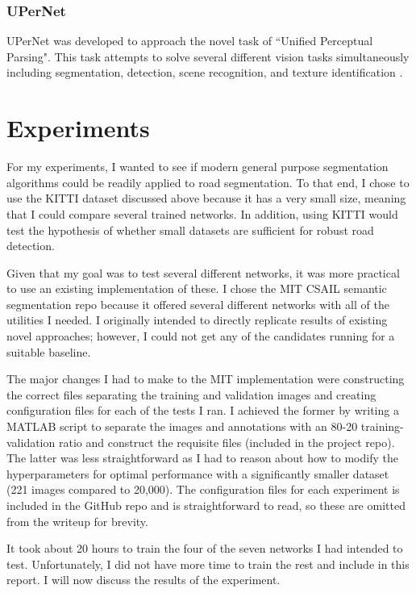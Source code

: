 \documentclass[10pt,twocolumn,letterpaper]{article}
\begin{document}
\subsubsection{UPerNet}
UPerNet was developed to approach the novel task of ``Unified Perceptual Parsing". This task attempts to solve several different vision tasks simultaneously including segmentation, detection, scene recognition, and texture identification \cite{Xiao18}.

\section{Experiments}
For my experiments, I wanted to see if modern general purpose segmentation algorithms could be readily applied to road segmentation. To that end, I chose to use the KITTI dataset discussed above because it has a very small size, meaning that I could compare several trained networks. In addition, using KITTI would test the hypothesis of whether small datasets are sufficient for robust road detection.

Given that my goal was to test several different networks, it was more practical to use an existing implementation of these. I chose the MIT CSAIL semantic segmentation repo because it offered several different networks with all of the utilities I needed. I originally intended to directly replicate results of existing novel approaches; however, I could not get any of the candidates running for a suitable baseline.

The major changes I had to make to the MIT implementation were constructing the correct files separating the training and validation images and creating configuration files for each of the tests I ran. I achieved the former by writing a MATLAB script to separate the images and annotations with an 80-20 training-validation ratio and construct the requisite files (included in the project repo). The latter was less straightforward as I had to reason about how to modify the hyperparameters for optimal performance with a significantly smaller dataset (221 images compared to 20,000). The configuration files for each experiment is included in the GitHub repo and is straightforward to read, so these are omitted from the writeup for brevity.

It took about 20 hours to train the four of the seven networks I had intended to test. Unfortunately, I did not have more time to train the rest and include in this report. I will now discuss the results of the experiment.
\end{document}
